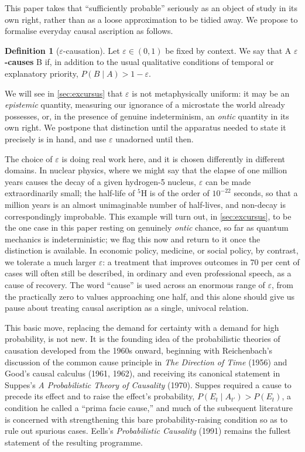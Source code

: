 \documentclass[11pt]{article}
\theoremstyle{definition}
\newtheorem{definition}{Definition}[section]
\newcommand{\eps}{\varepsilon}
\begin{document}
This paper takes that ``sufficiently probable'' seriously as an object of study in its own right, rather than as a loose approximation to be tidied away. We propose to formalise everyday causal ascription as follows.

\begin{definition}[$\eps$-causation]
\label{def:eps-causation}
Let $\eps \in (0,1)$ be fixed by context. We say that A \textbf{$\eps$-causes} B if, in addition to the usual qualitative conditions of temporal or explanatory priority, $P(B \mid A) > 1 - \eps$.
\end{definition}

We will see in \cref{sec:excursus} that $\eps$ is not metaphysically uniform: it may be an \emph{epistemic} quantity, measuring our ignorance of a microstate the world already possesses, or, in the presence of genuine indeterminism, an \emph{ontic} quantity in its own right. We postpone that distinction until the apparatus needed to state it precisely is in hand, and use $\eps$ unadorned until then.

The choice of $\eps$ is doing real work here, and it is chosen differently in different domains. In nuclear physics, where we might say that the elapse of one million years causes the decay of a given hydrogen-5 nucleus, $\eps$ can be made extraordinarily small; the half-life of $^5\mathrm{H}$ is of the order of $10^{-22}$ seconds, so that a million years is an almost unimaginable number of half-lives, and non-decay is correspondingly improbable. This example will turn out, in \cref{sec:excursus}, to be the one case in this paper resting on genuinely \emph{ontic} chance, so far as quantum mechanics is indeterministic; we flag this now and return to it once the distinction is available. In economic policy, medicine, or social policy, by contrast, we tolerate a much larger $\eps$: a treatment that improves outcomes in 70 per cent of cases will often still be described, in ordinary and even professional speech, as a cause of recovery. The word ``cause'' is used across an enormous range of $\eps$, from the practically zero to values approaching one half, and this alone should give us pause about treating causal ascription as a single, univocal relation.

This basic move, replacing the demand for certainty with a demand for high probability, is not new. It is the founding idea of the probabilistic theories of causation developed from the 1960s onward, beginning with Reichenbach's discussion of the common cause principle in \emph{The Direction of Time} (1956) and Good's causal calculus (1961, 1962), and receiving its canonical statement in Suppes's \emph{A Probabilistic Theory of Causality} (1970). Suppes required a cause to precede its effect and to raise the effect's probability, $P(E_{t} \mid A_{t'}) > P(E_{t})$, a condition he called a ``prima facie cause,'' and much of the subsequent literature is concerned with strengthening this bare probability-raising condition so as to rule out spurious cases. Eells's \emph{Probabilistic Causality} (1991) remains the fullest statement of the resulting programme.
\end{document}
